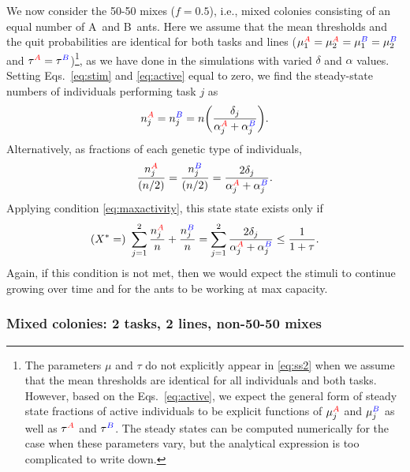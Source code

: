 \documentclass[11pt]{article}
\newcommand{\A}{{\color{red}A}}
\newcommand{\B}{{\color{blue}B}}
\begin{document}
\begin{appendices}
We now consider the 50-50 mixes ($f=0.5$), i.e., mixed colonies consisting of an equal number of \A\ and \B\ ants.
Here we assume that the mean thresholds and the quit probabilities are identical for both tasks and lines ($\mu_1^{\A} = \mu_2^{\A} = \mu_1^{\B} = \mu_2^{\B}$ and $\tau^{\A} = \tau^{\B}$)\footnote{The parameters $\mu$ and $\tau$ do not explicitly appear in \eqref{eq:ss2} when we assume that the mean thresholds are identical for all individuals and both tasks. However, based on the Eqs.~\eqref{eq:active}, we expect the general form of steady state fractions of active individuals to be explicit functions of $\mu_j^{\A}$ and $\mu_j^{\B}$ as well as $\tau^{\A}$ and $\tau^{\B}$. The steady states can be computed numerically for the case when these parameters vary, but the analytical expression is too complicated to write down.}, as we have done in the simulations with varied $\delta$ and $\alpha$ values. Setting Eqs.~\eqref{eq:stim} and \eqref{eq:active} equal to zero, we find the steady-state numbers of individuals performing task $j$ as
\begin{equation}
     n_j^{\A} =  n_j^{\B} = n\bigg(\frac{\delta_j}{\alpha_j^{\A} + \alpha_j^{\B}}\bigg). \label{eq:ss2a}
\end{equation}
Alternatively, as fractions of each genetic type of individuals,
\begin{equation}
     \frac{n_j^{\A}}{(n/2)} =  \frac{n_j^{\B}}{(n/2)} = \frac{2\delta_j}{\alpha_j^{\A} + \alpha_j^{\B}}. \label{eq:ss2}
\end{equation}
Applying condition \eqref{eq:maxactivity}, this state state exists only if
\begin{equation}
     (X^*=)\ \sum_{j=1}^2 \frac{n_j^{\A}}{n} + \frac{n_j^{\B}}{n} 
     = \sum_{j=1}^2 \frac{2\delta_j}{\alpha_j^{\A} + \alpha_j^{\B}}
     \leq \frac{1}{1+\tau}.
     \label{eq:cond2}
\end{equation}
Again, if this condition is not met, then we would expect the stimuli to continue growing over time and for the ants to be working at max capacity.

\subsubsection{Mixed colonies: 2 tasks, 2 lines, non-50-50 mixes}


\end{appendices}
\end{document}
